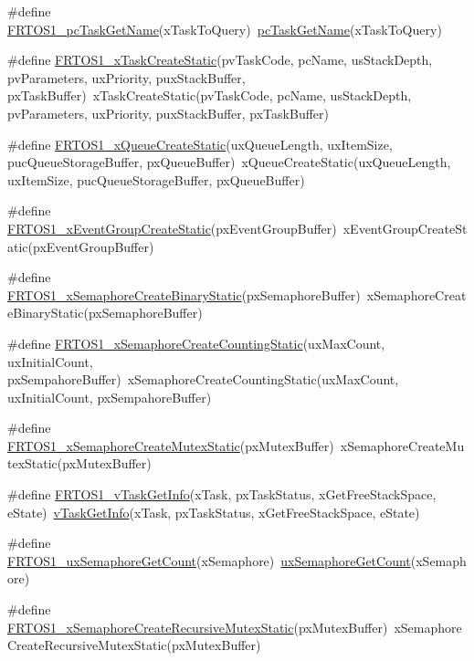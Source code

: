 \begin{DoxyCompactItemize}
\item 
\#define \hyperlink{group___f_r_t_o_s1__module_ga728d43a9aeb1f635e2d1c64ab31241e9}{F\+R\+T\+O\+S1\+\_\+pc\+Task\+Get\+Name}(x\+Task\+To\+Query)~\hyperlink{tasks_8c_a2ee63040e19e7c0cd7dbd070b8e1bca5}{pc\+Task\+Get\+Name}(x\+Task\+To\+Query)
\item 
\#define \hyperlink{group___f_r_t_o_s1__module_ga2fc2dc9f0df2c8c50a91a1b6a32bb3b1}{F\+R\+T\+O\+S1\+\_\+x\+Task\+Create\+Static}(pv\+Task\+Code,  pc\+Name,  us\+Stack\+Depth,  pv\+Parameters,  ux\+Priority,  pux\+Stack\+Buffer,  px\+Task\+Buffer)~x\+Task\+Create\+Static(pv\+Task\+Code, pc\+Name, us\+Stack\+Depth, pv\+Parameters, ux\+Priority, pux\+Stack\+Buffer, px\+Task\+Buffer)
\item 
\#define \hyperlink{group___f_r_t_o_s1__module_ga5e5ab53690f521cdd9cfd798a4f65bc3}{F\+R\+T\+O\+S1\+\_\+x\+Queue\+Create\+Static}(ux\+Queue\+Length,  ux\+Item\+Size,  puc\+Queue\+Storage\+Buffer,  px\+Queue\+Buffer)~x\+Queue\+Create\+Static(ux\+Queue\+Length, ux\+Item\+Size, puc\+Queue\+Storage\+Buffer, px\+Queue\+Buffer)
\item 
\#define \hyperlink{group___f_r_t_o_s1__module_gac9eec6e9aa8177a4b977c9923a8ad084}{F\+R\+T\+O\+S1\+\_\+x\+Event\+Group\+Create\+Static}(px\+Event\+Group\+Buffer)~x\+Event\+Group\+Create\+Static(px\+Event\+Group\+Buffer)
\item 
\#define \hyperlink{group___f_r_t_o_s1__module_gaee8fc6683370dc412d53ba3f6df987b6}{F\+R\+T\+O\+S1\+\_\+x\+Semaphore\+Create\+Binary\+Static}(px\+Semaphore\+Buffer)~x\+Semaphore\+Create\+Binary\+Static(px\+Semaphore\+Buffer)
\item 
\#define \hyperlink{group___f_r_t_o_s1__module_ga45e7bd6787a8b178322d49848ff6f382}{F\+R\+T\+O\+S1\+\_\+x\+Semaphore\+Create\+Counting\+Static}(ux\+Max\+Count,  ux\+Initial\+Count,  px\+Sempahore\+Buffer)~x\+Semaphore\+Create\+Counting\+Static(ux\+Max\+Count, ux\+Initial\+Count, px\+Sempahore\+Buffer)
\item 
\#define \hyperlink{group___f_r_t_o_s1__module_gaa31fd23221fda3263fb4b40b88d1643a}{F\+R\+T\+O\+S1\+\_\+x\+Semaphore\+Create\+Mutex\+Static}(px\+Mutex\+Buffer)~x\+Semaphore\+Create\+Mutex\+Static(px\+Mutex\+Buffer)
\item 
\#define \hyperlink{group___f_r_t_o_s1__module_gaadb1f1cae4b01cb6a8a3cdf65f0270a6}{F\+R\+T\+O\+S1\+\_\+v\+Task\+Get\+Info}(x\+Task,  px\+Task\+Status,  x\+Get\+Free\+Stack\+Space,  e\+State)~\hyperlink{task_8h_ac08c26d037d0dc685740eec9b2028715}{v\+Task\+Get\+Info}(x\+Task, px\+Task\+Status, x\+Get\+Free\+Stack\+Space, e\+State)
\item 
\#define \hyperlink{group___f_r_t_o_s1__module_ga1f3e62d8e496c0725b0beefb62bb9572}{F\+R\+T\+O\+S1\+\_\+ux\+Semaphore\+Get\+Count}(x\+Semaphore)~\hyperlink{semphr_8h_aa26a3d7cf9b5595a652daeb7f81229f3}{ux\+Semaphore\+Get\+Count}(x\+Semaphore)
\item 
\#define \hyperlink{group___f_r_t_o_s1__module_gae842ffded04aade1405792b39f2c0005}{F\+R\+T\+O\+S1\+\_\+x\+Semaphore\+Create\+Recursive\+Mutex\+Static}(px\+Mutex\+Buffer)~x\+Semaphore\+Create\+Recursive\+Mutex\+Static(px\+Mutex\+Buffer)
\end{DoxyCompactItemize}
